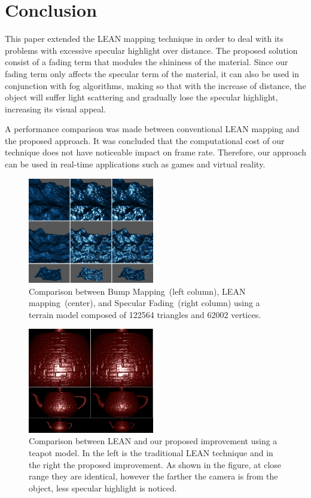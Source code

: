 \documentclass[10pt, conference]{IEEEtran}
\begin{document}
\section{Conclusion}
\label{sec:conclusion}
%
This paper extended the LEAN mapping technique in order to deal with its problems with excessive specular highlight over distance. The proposed solution consist of a fading term that modules the shininess of the material. Since our fading term only affects the specular term of the material, it can also be used in conjunction with fog algorithms, making so that with the increase of distance, the object will suffer light scattering and gradually lose the specular highlight, increasing its visual appeal.

A performance comparison was made between conventional LEAN mapping and the proposed approach. It was concluded that the computational cost of our technique does not have noticeable impact on frame rate. Therefore, our approach can be used in real-time applications such as games and virtual reality.

\begin{figure}[!t]
	\includegraphics[width=0.49\textwidth]{figs/terrain1.png}
	\caption{Comparison between Bump Mapping~(left column), LEAN mapping~(center), and Specular Fading~(right column) using a terrain model composed of 122564 triangles and 62002 vertices.}
	\label{fig:terrain1}
\end{figure}

\begin{figure}[!t]
	\includegraphics[width=0.49\textwidth]{figs/LS1.png}
	\caption{Comparison between LEAN and our proposed improvement using a teapot model. In the left is the traditional LEAN technique and in the right the proposed improvement. As shown in the figure, at close range they are identical, however the farther the camera is from the object, less specular highlight is noticed.}
	\label{fig:LS1}
\end{figure}
\end{document}
